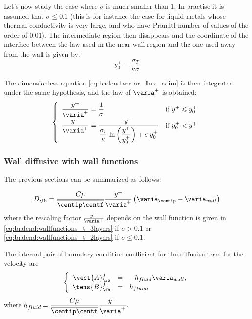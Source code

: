 Let's now study the case where  $\sigma$ is much smaller than $1$. 
In practise it is assumed that $\sigma \leqslant 0.1$ (this is for 
instance the case for liquid metals whose thermal conductivity is very 
large, and who have Prandtl number of values of the order of $0.01$).
The intermediate region then disappears and the coordinate of the 
interface between the law used in the near-wall region and the one
used away from the wall is given by: 
\begin{equation}
y^+_0= \displaystyle\frac{\sigma_T}{\kappa\sigma}
\end{equation}

The dimensionless equation \eqref{eq:bndcnd:scalar_flux_adim}
is then integrated under the same hypothesis, and the law of 
 $\varia^+$ is obtained:
\begin{equation}\label{eq:bndcnd:wallfunctions_t_2layers}
\left\{
\begin{array}{ll}
\dfrac{y^+}{\varia^+} = \dfrac{1}{\sigma} & \text{if } y^+ \leqslant y^+_0 \\
\dfrac{y^+}{\varia^+} = \dfrac{y^+}{\displaystyle\frac{\sigma_t}{\kappa}\,
        \ln\left(\displaystyle\frac{y^+}{y^+_0}\right)+\sigma \,y^+_0}
                   & \text{if } y^+_0 < y^+
\end{array}
\right.
\end{equation}

\subsubsection{Wall diffusive with wall functions}
The previous sections can be summarized as follows: 

\begin{equation}
D_\ib = \dfrac{C \mu}{\overline{\centip \centf} } \dfrac{y^+}{\varia^+} \left(\varia_\centip - \varia_{wall} \right)
\end{equation}
%
where the rescaling factor $\frac{y^+}{\varia^+}$ depends on the wall function is given in \eqref{eq:bndcnd:wallfunctions_t_3layers} if $\sigma >0.1$ or \eqref{eq:bndcnd:wallfunctions_t_2layers} if $\sigma \leq 0.1$.

The internal pair of boundary condition coefficient for the diffusive term for the velocity are 
\begin{equation}
\left\lbrace
\begin{array}{r c l}
\vect{A}^f_\ib & = & -h_{fluid} \varia_{wall}, \\
\tens{B}^f_\ib & = & h_{fluid},
\end{array}
\right.
\end{equation}
where $h_{fluid} = \dfrac{C \mu}{\overline{\centip \centf} } \dfrac{y^+}{\varia^+} $.
